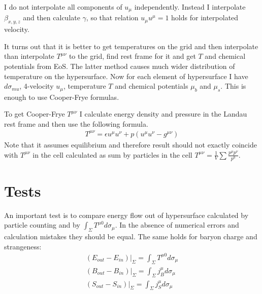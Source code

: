 \documentclass[12pt,a4paper]{report}
\begin{document}
I do not interpolate all components of $u_{\mu}$ independently. Instead I interpolate $\beta_{x,y,z}$ and then calculate $\gamma$, so that relation $u_{\mu}u^{\mu} = 1$ holds for interpolated velocity.

It turns out that it is better to get temperatures on the grid and then interpolate than interpolate $T^{\mu\nu}$ to the grid, find rest frame for it and get $T$ and chemical potentials from EoS. The latter method causes much wider distribution of temperature on the hypersurface.
Now for each element of hypersurface I have $d\sigma_{mu}$, 4-velocity $u_{\mu}$, temperature $T$ and chemical potentials $\mu_b$ and $\mu_s$. This is enough to use Cooper-Frye formulas.

To get Cooper-Frye $T^{\mu\nu}$ I calculate energy density and pressure in the Landau rest frame and then use the following formula.
\begin{eqnarray}
T^{\mu\nu} = \epsilon u^{\mu} u^{\nu} + p (u^{\mu} u^{\nu} - g^{\mu\nu})
\end{eqnarray}
Note that it assumes equilibrium and therefore result should not exactly coincide with $T^{\mu\nu}$ in the cell calculated as sum by particles in the cell $T^{\mu \nu} =\frac{1}{V} \sum \frac{p^{\mu}p^{\nu}}{p^0}$.






\section{Tests}

An important test is to compare energy flow out of hypersurface calculated by particle counting and by $\int_{\Sigma} T^{\mu0}d\sigma_{\mu}$. In the absence of numerical errors and calculation mistakes they should be equal. The same holds for baryon charge and strangeness:
\begin{eqnarray}
(E_{out} - E_{in}) |_{\Sigma} = \int _{\Sigma} T^{\mu0}d\sigma_{\mu}\\
(B_{out} - B_{in}) |_{\Sigma} = \int _{\Sigma} j_B^{\mu}d\sigma_{\mu}\\
(S_{out} - S_{in}) |_{\Sigma} = \int _{\Sigma} j_S^{\mu}d\sigma_{\mu}
\end{eqnarray}
\end{document}
